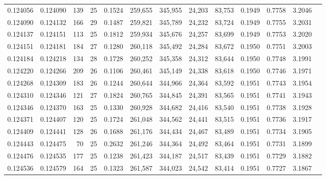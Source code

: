 \begin{tabular}{rrrrrrrrrrrrr}
0.124056 & 0.124090 & 139 &  25 &                                     0.1524 & 259,655 & 345,955 &  24,203 &  83,753 & 0.1949 & 0.7758 & 3.2046 \\
0.124090 & 0.124132 & 166 &  29 &                                     0.1487 & 259,821 & 345,789 &  24,232 &  83,724 & 0.1949 & 0.7755 & 3.2031 \\
0.124137 & 0.124151 & 113 &  25 &                                     0.1812 & 259,934 & 345,676 &  24,257 &  83,699 & 0.1949 & 0.7753 & 3.2020 \\
0.124151 & 0.124181 & 184 &  27 &                                     0.1280 & 260,118 & 345,492 &  24,284 &  83,672 & 0.1950 & 0.7751 & 3.2003 \\
0.124184 & 0.124218 & 134 &  28 &                                     0.1728 & 260,252 & 345,358 &  24,312 &  83,644 & 0.1950 & 0.7748 & 3.1991 \\
0.124220 & 0.124266 & 209 &  26 &                                     0.1106 & 260,461 & 345,149 &  24,338 &  83,618 & 0.1950 & 0.7746 & 3.1971 \\
0.124268 & 0.124309 & 183 &  26 &                                     0.1244 & 260,644 & 344,966 &  24,364 &  83,592 & 0.1951 & 0.7743 & 3.1954 \\
0.124310 & 0.124346 & 121 &  27 &                                     0.1824 & 260,765 & 344,845 &  24,391 &  83,565 & 0.1951 & 0.7741 & 3.1943 \\
0.124346 & 0.124370 & 163 &  25 &                                     0.1330 & 260,928 & 344,682 &  24,416 &  83,540 & 0.1951 & 0.7738 & 3.1928 \\
0.124371 & 0.124407 & 120 &  25 &                                     0.1724 & 261,048 & 344,562 &  24,441 &  83,515 & 0.1951 & 0.7736 & 3.1917 \\
0.124409 & 0.124441 & 128 &  26 &                                     0.1688 & 261,176 & 344,434 &  24,467 &  83,489 & 0.1951 & 0.7734 & 3.1905 \\
0.124443 & 0.124475 &  70 &  25 &                                     0.2632 & 261,246 & 344,364 &  24,492 &  83,464 & 0.1951 & 0.7731 & 3.1899 \\
0.124476 & 0.124535 & 177 &  25 &                                     0.1238 & 261,423 & 344,187 &  24,517 &  83,439 & 0.1951 & 0.7729 & 3.1882 \\
0.124536 & 0.124579 & 164 &  25 &                                     0.1323 & 261,587 & 344,023 &  24,542 &  83,414 & 0.1951 & 0.7727 & 3.1867 \\

\end{tabular}
